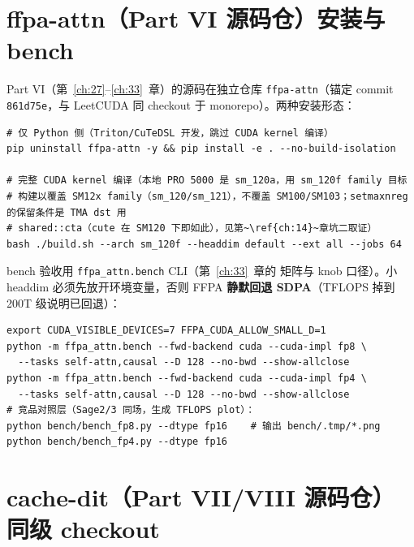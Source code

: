 \section{ffpa-attn（Part VI 源码仓）安装与 bench}

Part VI（第~\ref{ch:27}--\ref{ch:33}~章）的源码在独立仓库
\texttt{ffpa-attn}（锚定 commit \texttt{861d75e}，与 LeetCUDA 同 checkout
于 monorepo）。两种安装形态：

\begin{lstlisting}[style=console]
# 仅 Python 侧（Triton/CuTeDSL 开发，跳过 CUDA kernel 编译）
pip uninstall ffpa-attn -y && pip install -e . --no-build-isolation

# 完整 CUDA kernel 编译（本地 PRO 5000 是 sm_120a，用 sm_120f family 目标
# 构建以覆盖 SM12x family（sm_120/sm_121），不覆盖 SM100/SM103；setmaxnreg 的保留条件是 TMA dst 用
# shared::cta（cute 在 SM120 下即如此），见第~\ref{ch:14}~章坑二取证）
bash ./build.sh --arch sm_120f --headdim default --ext all --jobs 64
\end{lstlisting}

\noindent bench 验收用 \texttt{ffpa\_attn.bench} CLI（第~\ref{ch:33}~章的
矩阵与 knob 口径）。小 headdim 必须先放开环境变量，否则 FFPA
\textbf{静默回退 SDPA}（TFLOPS 掉到 200T 级说明已回退）：

\begin{lstlisting}[style=console]
export CUDA_VISIBLE_DEVICES=7 FFPA_CUDA_ALLOW_SMALL_D=1
python -m ffpa_attn.bench --fwd-backend cuda --cuda-impl fp8 \
  --tasks self-attn,causal --D 128 --no-bwd --show-allclose
python -m ffpa_attn.bench --fwd-backend cuda --cuda-impl fp4 \
  --tasks self-attn,causal --D 128 --no-bwd --show-allclose
# 竞品对照层（Sage2/3 同场，生成 TFLOPS plot）：
python bench/bench_fp8.py --dtype fp16    # 输出 bench/.tmp/*.png
python bench/bench_fp4.py --dtype fp16
\end{lstlisting}

\section{cache-dit（Part VII/VIII 源码仓）同级 checkout}

